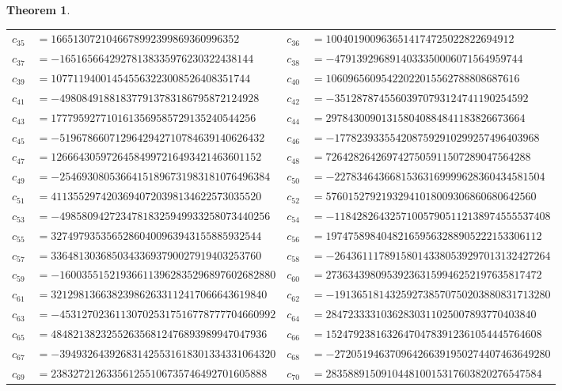 \documentclass[11pt,a4paper]{article}
\theoremstyle{plain}
\newtheorem{theorem}{Theorem}
\theoremstyle{definition}
\begin{document}
\begin{theorem}
\begin{center}
\begin{tabular}{r@{\,}l@{\qquad}r@{\,}l}
$c_{35}$ & $=1665130721046678992399869360996352$ & $c_{36}$ & $=1004019009636514174725022822694912$ \\
$c_{37}$ & $=-16516566429278138335976230322438144$ & $c_{38}$ & $=-4791392968914033350006071564959744$ \\
$c_{39}$ & $=107711940014545563223008526408351744$ & $c_{40}$ & $=10609656095422022015562788808687616$ \\
$c_{41}$ & $=-498084918818377913783186795872124928$ & $c_{42}$ & $=-35128787455603970793124741190254592$ \\
$c_{43}$ & $=1777959277101613569585729135240544256$ & $c_{44}$ & $=297843009013158040884841183826673664$ \\
$c_{45}$ & $=-5196786607129642942710784639140626432$ & $c_{46}$ & $=-1778239335542087592910299257496403968$ \\
$c_{47}$ & $=12666430597264584997216493421463601152$ & $c_{48}$ & $=7264282642697427505911507289047564288$ \\
$c_{49}$ & $=-25469308053664151896731983181076496384$ & $c_{50}$ & $=-22783464366815363169999628360434581504$ \\
$c_{51}$ & $=41135529742036940720398134622573035520$ & $c_{52}$ & $=57601527921932941018009306860680642560$ \\
$c_{53}$ & $=-49858094272347818325949933258073440256$ & $c_{54}$ & $=-118428264325710057905112138974555537408$ \\
$c_{55}$ & $=32749793535652860400963943155885932544$ & $c_{56}$ & $=197475898404821659563288905222153306112$ \\
$c_{57}$ & $=33648130368503433693790027919403253760$ & $c_{58}$ & $=-264361117891580143380539297013132427264$ \\
$c_{59}$ & $=-160035515219366113962835296897602682880$ & $c_{60}$ & $=273634398095392363159946252197635817472$ \\
$c_{61}$ & $=321298136638239862633112417066643619840$ & $c_{62}$ & $=-191365181432592738570750203880831713280$ \\
$c_{63}$ & $=-453127023611307025317516778777704660992$ & $c_{64}$ & $=28472333310362830311025007893770403840$ \\
$c_{65}$ & $=484821382325526356812476893989947047936$ & $c_{66}$ & $=152479238163264704783912361054445764608$ \\
$c_{67}$ & $=-394932643926831425531618301334331064320$ & $c_{68}$ & $=-272051946370964266391950274407463649280$ \\
$c_{69}$ & $=238327212633561255106735746492701605888$ & $c_{70}$ & $=283588915091044810015317603820276547584$ \\

\end{tabular}
\end{center}
\end{theorem}
\end{document}
